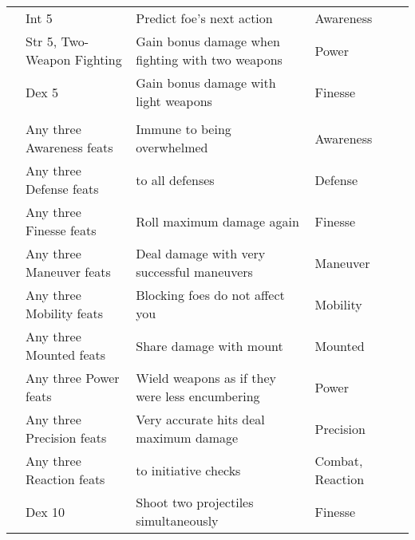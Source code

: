 {\begin{longtabu}{>{\lcol}p{10em} >{\lcol}p{15em} >{\lcol}X >{\lcol}p{6em} >{\lcol}p{3em}}
         & Int 5 & Predict foe's next action & Awareness &  \\
         & Str 5, Two-Weapon Fighting & Gain bonus damage when fighting with two weapons & Power &  \\
         & Dex 5 & Gain bonus damage with light weapons & Finesse &  \\

        \midrule
         &  &  &  &  \\
         & Any three Awareness feats & Immune to being overwhelmed & Awareness &  \\
         & Any three Defense feats &  to all defenses & Defense &  \\
         & Any three Finesse feats & Roll maximum damage again & Finesse &  \\
         & Any three Maneuver feats & Deal damage with very successful maneuvers & Maneuver &  \\
         & Any three Mobility feats & Blocking foes do not affect you & Mobility&  \\
         & Any three Mounted feats & Share damage with mount & Mounted&  \\
         & Any three Power feats & Wield weapons as if they were less encumbering & Power&  \\
         & Any three Precision feats & Very accurate hits deal maximum damage & Precision &  \\
         & Any three Reaction feats &  to initiative checks & Combat, Reaction &  \\
         & Dex 10 & Shoot two projectiles simultaneously & Finesse &  \\


\end{longtabu}}
